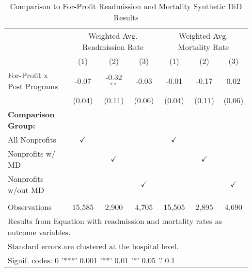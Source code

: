 \begin{table}[ht!]

\caption{\label{tab:forprofit_readmort_synth}Comparison to For-Profit Readmission and Mortality Synthetic DiD Results}
\centering
\begin{tabular}[t]{lcccccc}
\toprule
\multicolumn{1}{c}{ } & \multicolumn{3}{c}{Weighted Avg. Readmission Rate} & \multicolumn{3}{c}{Weighted Avg. Mortality Rate} \\
 & (1) & (2) & (3) & (1) & (2) & (3)\\
\midrule
For-Profit x Post Programs & -0.07 & -0.32$^{**}$ & -0.03 & -0.01 & -0.17 & 0.02\\
 & (0.04) & (0.11) & (0.06) & (0.04) & (0.11) & (0.06)\\
\textbf{Comparison Group:} &  &  &  &  &  & \\
All Nonprofits & $\checkmark$ &  &  & $\checkmark$ &  & \\
Nonprofits w/ MD &  & $\checkmark$ &  &  & $\checkmark$ & \\
\addlinespace
Nonprofits w/out MD &  &  & $\checkmark$ &  &  & $\checkmark$\\
 &  &  &  &  &  & \\
Observations & 15,585 & 2,900 & 4,705 & 15,505 & 2,895 & 4,690\\
\bottomrule
\multicolumn{7}{l}{\textsuperscript{} Results from Equation with readmission and mortality rates as outcome variables.}\\
\multicolumn{7}{l}{\textsuperscript{} Standard errors are clustered at the hospital level.}\\
\multicolumn{7}{l}{\textsuperscript{} Signif. codes: 0 '***' 0.001 '**' 0.01 '*' 0.05 '.' 0.1}\\
\end{tabular}
\end{table}
